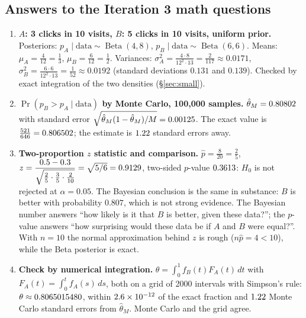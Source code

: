 \documentclass[11pt]{article}
\theoremstyle{definition}
\theoremstyle{remark}
\renewcommand{\Pr}{\operatorname{Pr}}
\newcommand{\Betad}{\operatorname{Beta}}
\newcommand{\data}{\text{data}}
\begin{document}
\subsection{Answers to the Iteration 3 math questions}\label{sec:it3-questions}

\begin{enumerate}[label=\textbf{Q\arabic*.},leftmargin=*]
\item \textbf{$A$: 3 clicks in 10 visits, $B$: 5 clicks in 10 visits, uniform prior.}
  Posteriors: $p_A\mid\data\sim\Betad(4,8)$, $p_B\mid\data\sim\Betad(6,6)$.
  Means: $\mu_A=\frac4{12}=\frac13$, $\mu_B=\frac6{12}=\frac12$.
  Variances: $\sigma_A^2=\frac{4\cdot8}{12^2\cdot13}=\frac2{117}\approx0.0171$,
  $\sigma_B^2=\frac{6\cdot6}{12^2\cdot13}=\frac1{52}\approx0.0192$ (standard deviations $0.131$ and $0.139$).
  Checked by exact integration of the two densities (\S\ref{sec:small}).

\item \textbf{$\Pr(p_B>p_A\mid\data)$ by Monte Carlo, 100{,}000 samples.}
  $\hat\theta_M=0.80802$ with standard error $\sqrt{\hat\theta_M(1-\hat\theta_M)/M}=0.00125$.
  The exact value is $\tfrac{521}{646}=0.806502$; the estimate is $1.22$ standard errors away.

\item \textbf{Two-proportion $z$ statistic and comparison.}
  $\hat p=\frac8{20}=\frac25$, $z=\dfrac{0.5-0.3}{\sqrt{\frac25\cdot\frac35\cdot\frac2{10}}}=\sqrt{5/6}=0.9129$,
  two-sided $p$-value $0.3613$: $H_0$ is not rejected at $\alpha=0.05$. The Bayesian conclusion is the same in
  substance: $B$ is better with probability $0.807$, which is not strong evidence. The Bayesian number answers
  ``how likely is it that $B$ is better, given these data?''; the $p$-value answers ``how surprising would these
  data be if $A$ and $B$ were equal?''. With $n=10$ the normal approximation behind $z$ is rough
  ($n\hat p=4<10$), while the Beta posterior is exact.

\item \textbf{Check by numerical integration.}
  $\theta=\int_0^1 f_B(t)F_A(t)\,dt$ with $F_A(t)=\int_0^t f_A(s)\,ds$, both on a grid of 2000 intervals with
  Simpson's rule: $\theta\approx0.8065015480$, within $2.6\times10^{-12}$ of the exact fraction and $1.22$ Monte Carlo
  standard errors from $\hat\theta_M$. Monte Carlo and the grid agree.


\end{enumerate}
\end{document}
